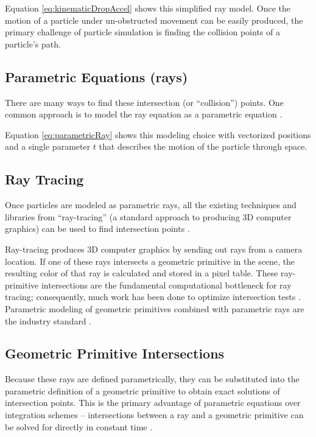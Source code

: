 Equation \eqref{eq:kinematicDropAccel} shows this simplified ray model. Once the motion of a particle under un-obstructed movement can be easily produced, the primary challenge of particle simulation is finding the collision points of a particle's path.

	\subsection{Parametric Equations (rays)}

There are many ways to find these intersection (or ``collision'') points. One common approach is to model the ray equation as a parametric equation \cite{purcell2002ray}.

 {
	\label{eq:parametricRay}
}

Equation \eqref{eq:parametricRay} shows this modeling choice with vectorized positions and a single parameter $t$ that describes the motion of the particle through space.


	\subsection{Ray Tracing}

Once particles are modeled as parametric rays, all the existing techniques and libraries from ``ray-tracing'' (a standard approach to producing 3D computer graphics) can be used to find intersection points \cite{purcell2002ray}.

Ray-tracing produces 3D computer graphics by sending out rays from a camera location. If one of these rays intersects a geometric primitive in the scene, the resulting color of that ray is calculated and stored in a pixel table. These ray-primitive intersections are the fundamental computational bottleneck for ray tracing; consequently, much work has been done to optimize intersection tests \cite{purcell2002ray}. Parametric modeling of geometric primitives combined with parametric rays are the industry standard \cite{glassner1989introduction}.

	\subsection{Geometric Primitive Intersections}

Because these rays are defined parametrically, they can be substituted into the parametric definition of a geometric primitive to obtain exact solutions of intersection points. This is the primary advantage of parametric equations over integration schemes -- intersections between a ray and a geometric primitive can be solved for directly in constant time \cite{glassner1989introduction}.

